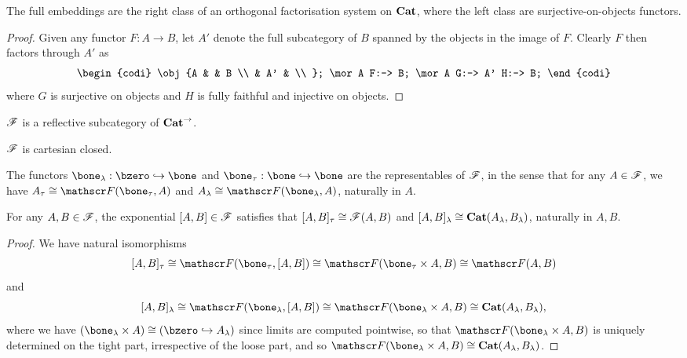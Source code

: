 \documentclass[../thesis.tex]{subfiles}
\begin{document}
  \begin{lemma}
    The full embeddings are the right class of an orthogonal factorisation system on ${\mathbf{Cat}}$, where
    the left class are surjective-on-objects functors.
  \end{lemma}
  \begin{proof}
    Given any functor $F : A \to B$, let $A'$ denote the full subcategory of $B$ spanned by the
    objects in the image of $F$. Clearly $F$ then factors through $A'$ as
    \[\begin{codi}
      \obj {A & & B \\
            & A' & \\ };
      \mor A F:-> B;
      \mor A G:-> A' H:-> B;
    \end{codi}\]
    where $G$ is surjective on objects and $H$ is fully faithful and injective on objects.
  \end{proof}

  \begin{corollary}
    ${\mathscr{F}}$ is a reflective subcategory of ${\mathbf{Cat}}^\to$.
  \end{corollary}

  \begin{corollary}
    ${\mathscr{F}}$ is cartesian closed.
  \end{corollary}

  \begin{lemma}
    The functors $\bone_\lambda : \bzero \into \bone$ and $\bone_\tau : \bone \into \bone$ are the
    representables of ${\mathscr{F}}$, in the sense that for any $A \in {\mathscr{F}}$, we have $A_\tau \cong \sF(\bone_%
    \tau, A)$ and $A_\lambda
    \cong \sF(\bone_\lambda, A)$, naturally in $A$.
  \end{lemma}

  \begin{corollary}
    For any $A, B \in {\mathscr{F}}$, the exponential $[A,B] \in {\mathscr{F}}$ satisfies that $[A,B]_\tau \cong {\mathscr{F}}(A,B)
    $ and $[A,B]_\lambda \cong {\mathbf{Cat}}(A_\lambda, B_\lambda)$, naturally in $A,B$.
  \end{corollary}
  \begin{proof}
    We have natural isomorphisms
    \[[A,B]_\tau \cong \sF(\bone_\tau, [A,B]) \cong \sF(\bone_\tau \times A, B) \cong \sF(A,B)\]
    and
    \[[A,B]_\lambda \cong \sF(\bone_\lambda, [A,B]) \cong \sF(\bone_\lambda \times A, B) \cong
    \Cat(A_\lambda, B_\lambda),\]
    where we have $(\bone_\lambda \times A) \cong (\bzero \into A_\lambda)$ since limits are computed
    pointwise, so that $\sF(\bone_\lambda \times A, B)$ is uniquely determined on the tight part,
    irrespective of the loose part, and so $\sF(\bone_\lambda \times A, B) \cong \Cat(A_\lambda, B_%
    \lambda)$.
  \end{proof}
  
\end{document}
